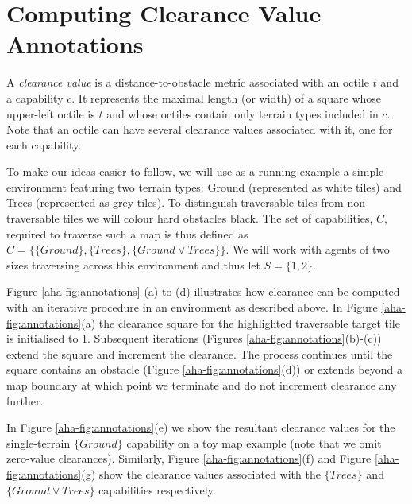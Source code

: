 \section{Computing Clearance Value Annotations}
\label{aha:planningwithannotations}
A \emph{clearance value} is a distance-to-obstacle metric associated with an octile $t$ and a capability $c$.
It represents the maximal length (or width) of a square whose upper-left octile is $t$ and whose octiles contain only terrain types included in $c$.
Note that an octile can have several clearance values associated with it, one for each capability. 

To make our ideas easier to follow, we will use as a running example a simple environment featuring two terrain types: Ground (represented as white tiles) and Trees (represented as grey tiles). 
To distinguish traversable tiles from non-traversable tiles we will colour hard obstacles black. 
The set of capabilities, $C$, required to traverse such a map is thus defined as $C = \lbrace \lbrace \textit{Ground} \rbrace, \lbrace \textit{Trees} \rbrace, \lbrace \textit{Ground} \vee \textit{Trees} \rbrace \rbrace$. 
We will work with agents of two sizes traversing across this environment and thus let $S = \lbrace 1, 2 \rbrace$.
\par \indent
Figure \ref{aha-fig:annotations} (a) to (d) illustrates how clearance can be computed with an iterative procedure in an environment as described above.
In Figure \ref{aha-fig:annotations}(a) the clearance square for the highlighted traversable target tile is initialised to 1. 
Subsequent iterations (Figures \ref{aha-fig:annotations}(b)-(c)) extend the square and increment the clearance. 
The process continues until the square contains an obstacle (Figure \ref{aha-fig:annotations}(d)) or extends beyond a map boundary at which point we terminate and do not increment clearance any further.
\par \indent
In Figure \ref{aha-fig:annotations}(e) we show the resultant clearance values for the single-terrain $\lbrace \textit{Ground} \rbrace$ capability on a toy map example (note that we omit zero-value clearances).
Similarly, Figure \ref{aha-fig:annotations}(f) and Figure \ref{aha-fig:annotations}(g) show the clearance values associated with the $\lbrace \textit{Trees} \rbrace$ and $\lbrace \textit{Ground} \vee \textit{Trees} \rbrace$ capabilities respectively.  

